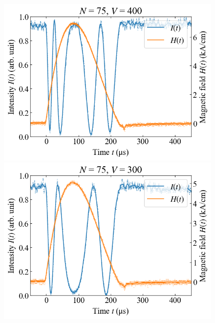 \documentclass[9pt,dvipdfmx,a4paper]{jsarticle}
\begin{document}
\begin{figure}[H]
    \centering
    \begin{minipage}[t]{0.24\columnwidth}
        \centering
        \includegraphics[width = \columnwidth]{xt/09.png}
    \end{minipage}
    \hfill
    \begin{minipage}[t]{0.24\columnwidth}
        \centering
        \includegraphics[width = \columnwidth]{xt/10.png}
    \end{minipage}
    \hfill
    \begin{minipage}[t]{0.24\columnwidth}
        \centering

\end{minipage}
\end{figure}
\end{document}
